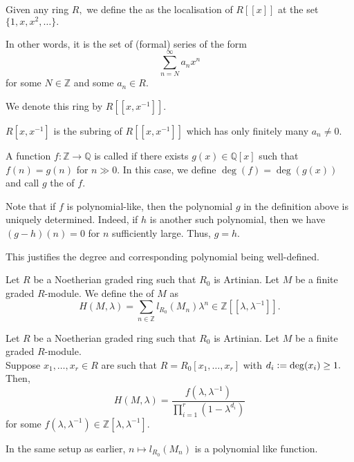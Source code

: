 \documentclass[12pt]{article}	%
\begin{document}
\begin{defn}
	Given any ring $R,$ we define the  as the localisation of $R[\![x]\!]$ at the set $\{1, x, x^2, \ldots\}.$

	In other words, it is the set of (formal) series of the form
	\begin{equation*} 
		\sum_{n = N}^{\infty}a_nx^n
	\end{equation*}
	for some $N \in \mathbb{Z}$ and some $a_n \in R.$

	We denote this ring by $R[\![x, x^{-1}]\!].$

	$R[x, x^{-1}]$ is the subring of $R[\![x, x^{-1}]\!]$ which has only finitely many $a_n \neq 0.$
\end{defn}

\begin{defn}%
	A function $f : \mathbb{Z} \to \mathbb{Q}$ is called  if there exists $g(x) \in \mathbb{Q}[x]$ such that $f(n) = g(n)$ for $n \gg 0.$ In this case, we define $\deg(f) = \deg(g(x))$ and call $g$ the  of $f.$
\end{defn}
\begin{rem}
	Note that if $f$ is polynomial-like, then the polynomial $g$ in the definition above is uniquely determined. Indeed, if $h$ is another such polynomial, then we have $(g - h)(n) = 0$ for $n$ sufficiently large. Thus, $g = h.$ 

	This justifies the degree and corresponding polynomial being well-defined.
\end{rem}

\begin{defn}%
	Let $R$ be a Noetherian graded ring such that $R_0$ is Artinian. Let $M$ be a finite graded $R$-module. We define the  of $M$ as
	\begin{equation*} 
		H(M, \lambda) = \sum_{n \in \mathbb{Z}} l_{R_0}(M_n)\lambda^n \in \mathbb{Z}[\![\lambda, \lambda^{-1}]\!].
	\end{equation*}
\end{defn}

\begin{thm}
	Let $R$ be a Noetherian graded ring such that $R_0$ is Artinian. Let $M$ be a finite graded $R$-module. \\
	Suppose $x_1, \ldots, x_r \in R$ are such that $R = R_0[x_1, \ldots, x_r]$ with $d_i \vcentcolon= \deg(x_i) \ge 1.$ Then,
	\begin{equation*} 
		H(M, \lambda) = \frac{f(\lambda, \lambda^{-1})}{\prod_{i = 1}^{r}(1 - \lambda^{d_i})}
	\end{equation*}
	for some $f(\lambda, \lambda^{-1}) \in \mathbb{Z}[\lambda, \lambda^{-1}].$
\end{thm}
\begin{cor}
	In the same setup as earlier, $n \mapsto l_{R_0}(M_n)$ is a polynomial like function. 
\end{cor}
\end{document}
